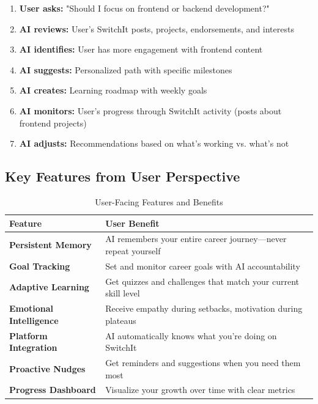 \documentclass[12pt,a4paper]{article}
\begin{document}
\begin{enumerate}[leftmargin=*]
    \item \textbf{User asks:} "Should I focus on frontend or backend development?"
    
    \item \textbf{AI reviews:} User's SwitchIt posts, projects, endorsements, and interests
    
    \item \textbf{AI identifies:} User has more engagement with frontend content
    
    \item \textbf{AI suggests:} Personalized path with specific milestones
    
    \item \textbf{AI creates:} Learning roadmap with weekly goals
    
    \item \textbf{AI monitors:} User's progress through SwitchIt activity (posts about frontend projects)
    
    \item \textbf{AI adjusts:} Recommendations based on what's working vs. what's not
\end{enumerate}

\subsection{Key Features from User Perspective}

\begin{table}[h]
\centering
\begin{tabularx}{\textwidth}{|l|X|}
\hline
\textbf{Feature} & \textbf{User Benefit} \\
\hline
\textbf{Persistent Memory} & AI remembers your entire career journey—never repeat yourself \\
\hline
\textbf{Goal Tracking} & Set and monitor career goals with AI accountability \\
\hline
\textbf{Adaptive Learning} & Get quizzes and challenges that match your current skill level \\
\hline
\textbf{Emotional Intelligence} & Receive empathy during setbacks, motivation during plateaus \\
\hline
\textbf{Platform Integration} & AI automatically knows what you're doing on SwitchIt \\
\hline
\textbf{Proactive Nudges} & Get reminders and suggestions when you need them most \\
\hline
\textbf{Progress Dashboard} & Visualize your growth over time with clear metrics \\
\hline
\end{tabularx}
\caption{User-Facing Features and Benefits}
\end{table}
\end{document}
